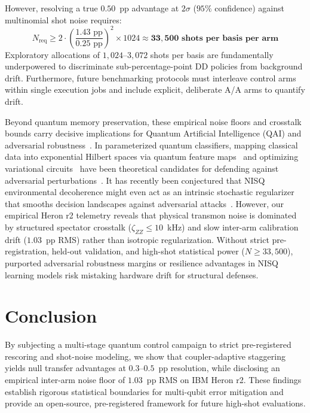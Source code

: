 \documentclass[aps,prl,twocolumn,amsmath,amssymb,superscriptaddress,floatfix]{revtex4-2}
\begin{document}
However, resolving a true $0.50$~pp advantage at $2\sigma$ ($95\%$ confidence) against multinomial shot noise requires:
\begin{equation}
N_{\text{req}} \ge 2 \cdot \left(\frac{1.43\text{ pp}}{0.25\text{ pp}}\right)^2 \times 1024 \approx \mathbf{33,500\text{ shots per basis per arm}}
\end{equation}
Exploratory allocations of $1{,}024\text{--}3{,}072$ shots per basis are fundamentally underpowered to discriminate sub-percentage-point DD policies from background drift. Furthermore, future benchmarking protocols must interleave control arms within single execution jobs and include explicit, deliberate A/A arms to quantify drift.

Beyond quantum memory preservation, these empirical noise floors and crosstalk bounds carry decisive implications for Quantum Artificial Intelligence (QAI) and adversarial robustness~\cite{Sen2024}. In parameterized quantum classifiers, mapping classical data into exponential Hilbert spaces via quantum feature maps~\cite{Havlicek2019} and optimizing variational circuits~\cite{Cerezo2021} have been theoretical candidates for defending against adversarial perturbations~\cite{West2023a}. It has recently been conjectured that NISQ environmental decoherence might even act as an intrinsic stochastic regularizer that smooths decision landscapes against adversarial attacks~\cite{Nowmi2025}. However, our empirical Heron r2 telemetry reveals that physical transmon noise is dominated by structured spectator crosstalk ($\zeta_{ZZ} \le 10$~kHz) and slow inter-arm calibration drift ($1.03$~pp RMS) rather than isotropic regularization. Without strict pre-registration, held-out validation, and high-shot statistical power ($N \ge 33{,}500$), purported adversarial robustness margins or resilience advantages in NISQ learning models risk mistaking hardware drift for structural defenses.

\section{Conclusion}
By subjecting a multi-stage quantum control campaign to strict pre-registered rescoring and shot-noise modeling, we show that coupler-adaptive staggering yields null transfer advantages at $0.3\text{--}0.5$~pp resolution, while disclosing an empirical inter-arm noise floor of $1.03$~pp RMS on IBM Heron r2. These findings establish rigorous statistical boundaries for multi-qubit error mitigation and provide an open-source, pre-registered framework for future high-shot evaluations.
\end{document}
